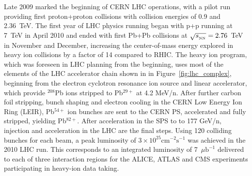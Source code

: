 Late 2009 marked the beginning of CERN LHC operations, with a pilot run providing
first proton+proton collisions with collision energies of 0.9 and 2.36~TeV. 
The first year of LHC physics running began with p+p running at 7~TeV in April 2010 and 
ended with first Pb+Pb collisions at $\sqrt{s_{_{\rm NN}}} = 2.76$~TeV in November and 
December, increasing the center-of-mass energy explored in heavy ion collisions by a factor 
of 14 compared to RHIC. The heavy ion program, which was foreseen in LHC
planning from the beginning, uses most of the elements of the LHC 
accelerator chain shown in in Figure~\ref{fig:lhc_complex}, beginning
from the electron cyclotron resonance ion source and linear accelerator, 
which provide $^{208}$Pb ions stripped to Pb$^{29+}$ at 4.2 MeV/n.
After further carbon foil stripping, bunch shaping and 
electron cooling in the CERN Low Energy Ion Ring (LEIR),  
Pb$^{54+}$ ion bunches are sent to the CERN PS, accelerated and fully stripped,
yielding Pb$^{82+}$.  After acceleration in the SPS to to 177 GeV/n,
injection and acceleration in the LHC are the final steps. 
Using 120 colliding bunches for each beam, a peak luminosity of 
$3 \times 10^{25} \mathrm{cm}^{-2} \mathrm{s}^{-1}$ was achieved 
in the 2010 LHC run.  This corresponds to an 
integrated luminosity of 7~$\mu \mathrm{b}^{-1}$ delivered to each
of three interaction regions for the ALICE, ATLAS and CMS experiments
participating in heavy-ion data taking. 


